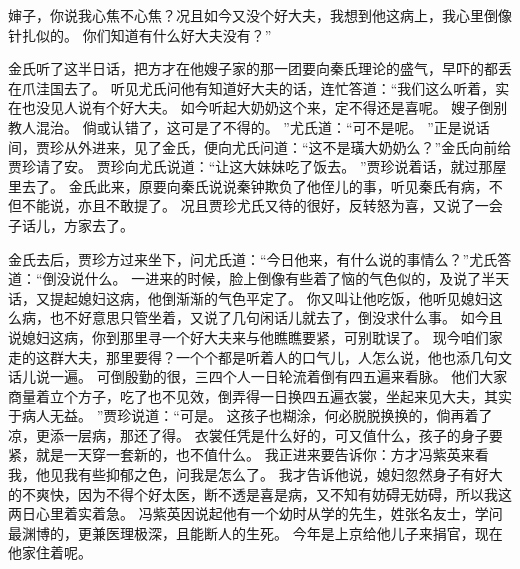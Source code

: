 婶子，你说我心焦不心焦？况且如今又没个好大夫，我想到他这病上，我心里倒像针扎似的。
你们知道有什么好大夫没有？”\par
金氏听了这半日话，把方才在他嫂子家的那一团要向秦氏理论的盛气，早吓的都丢在爪洼国去了。
听见尤氏问他有知道好大夫的话，连忙答道：“我们这么听着，实在也没见人说有个好大夫。
如今听起大奶奶这个来，定不得还是喜呢。
嫂子倒别教人混治。
倘或认错了，这可是了不得的。
”尤氏道：“可不是呢。
”正是说话间，贾珍从外进来，见了金氏，便向尤氏问道：“这不是璜大奶奶么？”金氏向前给贾珍请了安。
贾珍向尤氏说道：“让这大妹妹吃了饭去。
”贾珍说着话，就过那屋里去了。
金氏此来，原要向秦氏说说秦钟欺负了他侄儿的事，听见秦氏有病，不但不能说，亦且不敢提了。
况且贾珍尤氏又待的很好，反转怒为喜，又说了一会子话儿，方家去了。
\par
金氏去后，贾珍方过来坐下，问尤氏道：“今日他来，有什么说的事情么？”尤氏答道：“倒没说什么。
一进来的时候，脸上倒像有些着了恼的气色似的，及说了半天话，又提起媳妇这病，他倒渐渐的气色平定了。
你又叫让他吃饭，他听见媳妇这么病，也不好意思只管坐着，又说了几句闲话儿就去了，倒没求什么事。
如今且说媳妇这病，你到那里寻一个好大夫来与他瞧瞧要紧，可别耽误了。
现今咱们家走的这群大夫，那里要得？一个个都是听着人的口气儿，人怎么说，他也添几句文话儿说一遍。
可倒殷勤的很，三四个人一日轮流着倒有四五遍来看脉。
他们大家商量着立个方子，吃了也不见效，倒弄得一日换四五遍衣裳，坐起来见大夫，其实于病人无益。
”贾珍说道：“可是。
这孩子也糊涂，何必脱脱换换的，倘再着了凉，更添一层病，那还了得。
衣裳任凭是什么好的，可又值什么，孩子的身子要紧，就是一天穿一套新的，也不值什么。
我正进来要告诉你：方才冯紫英来看我，他见我有些抑郁之色，问我是怎么了。
我才告诉他说，媳妇忽然身子有好大的不爽快，因为不得个好太医，断不透是喜是病，又不知有妨碍无妨碍，所以我这两日心里着实着急。
冯紫英因说起他有一个幼时从学的先生，姓张名友士，学问最渊博的，更兼医理极深，且能断人的生死。
今年是上京给他儿子来捐官，现在他家住着呢。
